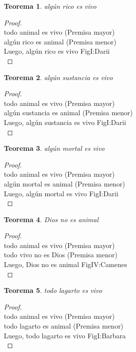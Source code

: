 ﻿\documentclass[12pt]{book}
\newtheorem{theorem}{Teorema}[chapter]
\newtheorem{proof}{Demostración}
\begin{document}
\begin{theorem}
algún rico es vivo
\label{th: 47}
\end{theorem}\begin{proof}\\todo animal es vivo	 (Premisa mayor) \\algún rico es animal	 (Premisa menor) \\Luego, algún rico es vivo	FigI:Darii \\ \end{proof}
\begin{theorem}
algún sustancia es vivo
\label{th: 48}
\end{theorem}\begin{proof}\\todo animal es vivo	 (Premisa mayor) \\algún sustancia es animal	 (Premisa menor) \\Luego, algún sustancia es vivo	FigI:Darii \\ \end{proof}
\begin{theorem}
algún mortal es vivo
\label{th: 49}
\end{theorem}\begin{proof}\\todo animal es vivo	 (Premisa mayor) \\algún mortal es animal	 (Premisa menor) \\Luego, algún mortal es vivo	FigI:Darii \\ \end{proof}
\begin{theorem}
Dios no es animal
\label{th: 50}
\end{theorem}\begin{proof}\\todo animal es vivo	 (Premisa mayor) \\todo vivo no es Dios	 (Premisa menor) \\Luego, Dios no es animal	FigIV:Camenes \\ \end{proof}
\begin{theorem}
todo lagarto es vivo
\label{th: 51}
\end{theorem}\begin{proof}\\todo animal es vivo	 (Premisa mayor) \\todo lagarto es animal	 (Premisa menor) \\Luego, todo lagarto es vivo	FigI:Barbara \\ \end{proof}
\end{document}
